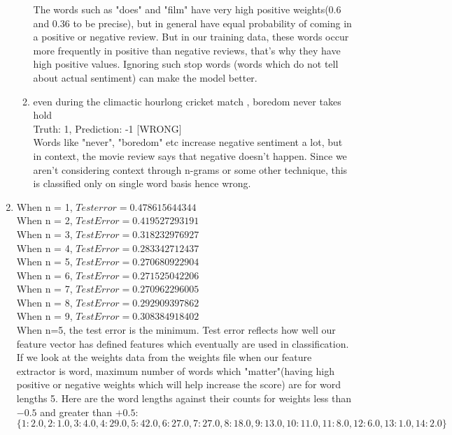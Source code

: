 \documentclass[12pt]{article}
\begin{document}
\begin{enumerate}[label=(\alph*)]
\begin{enumerate}[label=(\arabic*)]
		The words such as "does" and "film" have very high positive weights(0.6 and 0.36 to be precise), but in general have equal probability of coming in a positive or negative review. But in our training data, these words occur more frequently in positive than negative reviews, that's why they have high positive values.  Ignoring such stop words (words which do not tell about actual sentiment) can make the model better.
		
		\item even during the climactic hourlong cricket match , boredom never takes hold \\
		Truth: 1, Prediction: -1 [WRONG] \\
		
		Words like "never", "boredom" etc increase negative sentiment a lot, but in context, the movie review says that negative doesn't happen. Since we aren't considering context through n-grams or some other technique, this is classified only on single word basis hence wrong.
	\end{enumerate}
	\addtocounter{enumi}{1}
	\item When n = 1, $Test error = 0.478615644344$ \\
	When n = 2, $Test Error = 0.419527293191$ \\
	When n = 3, $Test Error = 0.318232976927$ \\
	When n = 4, $Test Error = 0.283342712437$ \\
	When n = 5, $Test Error = 0.270680922904$ \\
	When n = 6, $Test Error = 0.271525042206$ \\
	When n = 7, $Test Error = 0.270962296005$ \\
	When n = 8, $Test Error = 0.292909397862$ \\
	When n = 9, $Test Error = 0.308384918402$ \\

	When n=5, the test error is the minimum. Test error reflects how well our feature vector has defined features which eventually are used in classification. If we look at the weights data from the weights file when our feature extractor is word, maximum number of words which "matter"(having high positive or negative weights which will help increase the score) are for word lengths 5. Here are the word lengths against their counts for weights less than $-0.5$ and greater than $+0.5$:
	$$\{1: 2.0, 2: 1.0, 3: 4.0, 4: 29.0, 5: 42.0, 6: 27.0, 7: 27.0, 8: 18.0, 9: 13.0, 10: 11.0, 11: 8.0, 12: 6.0, 13: 1.0, 14: 2.0\} $$
	

\end{enumerate}
\end{document}
